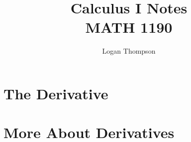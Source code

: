 

\title{
    Calculus I Notes\\
    \large MATH 1190}
\author{Logan Thompson}
\date{}


\maketitle
\tableofcontents
\newpage
{}
\chapter{The Derivative}





\chapter{More About Derivatives}




